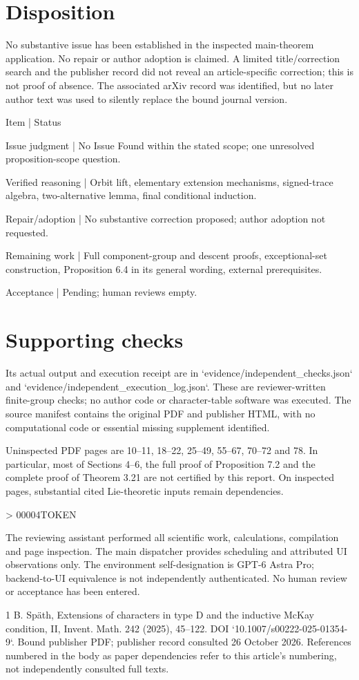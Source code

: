 \documentclass[10pt]{article}
\begin{document}
\section*{Disposition}
No substantive issue has been established in the inspected main-theorem application. No repair or author adoption is claimed. A limited title/correction search and the publisher record did not reveal an article-specific correction; this is not proof of absence. The associated arXiv record was identified, but no later author text was used to silently replace the bound journal version.\par
Item | Status\par
Issue judgment | No Issue Found within the stated scope; one unresolved proposition-scope question.\par
Verified reasoning | Orbit lift, elementary extension mechanisms, signed-trace algebra, two-alternative lemma, final conditional induction.\par
Repair/adoption | No substantive correction proposed; author adoption not requested.\par
Remaining work | Full component-group and descent proofs, exceptional-set construction, Proposition 6.4 in its general wording, external prerequisites.\par
Acceptance | Pending; human reviews empty.\par
\section*{Supporting checks}
Its actual output and execution receipt are in `evidence/independent\_checks.json` and `evidence/independent\_execution\_log.json`. These are reviewer-written finite-group checks; no author code or character-table software was executed. The source manifest contains the original PDF and publisher HTML, with no computational code or essential missing supplement identified.\par
Uninspected PDF pages are 10–11, 18–22, 25–49, 55–67, 70–72 and 78. In particular, most of Sections 4–6, the full proof of Proposition 7.2 and the complete proof of Theorem 3.21 are not certified by this report. On inspected pages, substantial cited Lie-theoretic inputs remain dependencies.\par
> 00004TOKEN\par
The reviewing assistant performed all scientific work, calculations, compilation and page inspection. The main dispatcher provides scheduling and attributed UI observations only. The environment self-designation is GPT-6 Astra Pro; backend-to-UI equivalence is not independently authenticated. No human review or acceptance has been entered.\par
1 B. Späth, Extensions of characters in type D and the inductive McKay condition, II, Invent. Math. 242 (2025), 45–122. DOI `10.1007/s00222-025-01354-9`. Bound publisher PDF; publisher record consulted 26 October 2026. References numbered in the body as paper dependencies refer to this article’s numbering, not independently consulted full texts.\par
\end{document}
